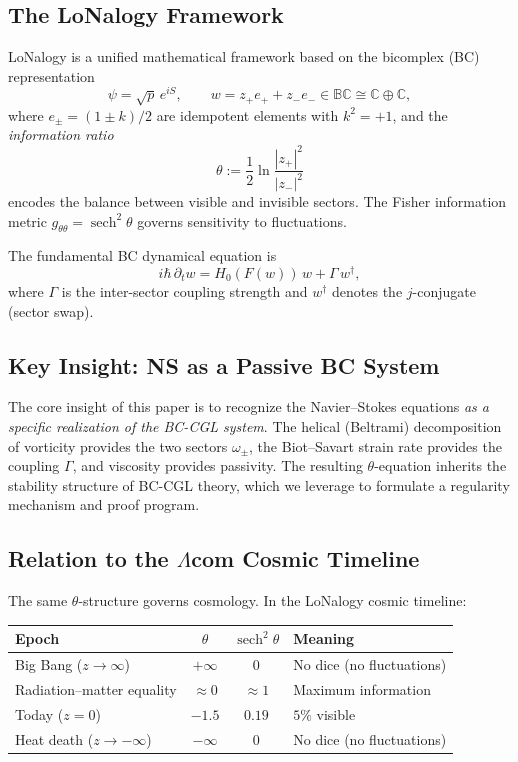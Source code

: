 \documentclass[12pt,a4paper]{article}
\theoremstyle{definition}
\newcommand{\sech}{\operatorname{sech}}
\newcommand{\BC}{\mathbb{BC}}
\newcommand{\C}{\mathbb{C}}
\begin{document}
\subsection{The LoNalogy Framework}

LoNalogy is a unified mathematical framework based on the bicomplex (BC) representation
\begin{equation}\label{eq:lonalogy}
  \psi = \sqrt{p}\,e^{iS}, \qquad
  w = z_+ e_+ + z_- e_- \in \BC \cong \C \oplus \C,
\end{equation}
where $e_\pm = (1 \pm k)/2$ are idempotent elements with $k^2 = +1$, and the \emph{information ratio}
\begin{equation}\label{eq:theta}
  \theta := \frac{1}{2}\ln\frac{|z_+|^2}{|z_-|^2}
\end{equation}
encodes the balance between visible and invisible sectors. The Fisher information metric $g_{\theta\theta} = \sech^2\theta$ governs sensitivity to fluctuations.

The fundamental BC dynamical equation is
\begin{equation}\label{eq:BC}
  i\hbar\,\partial_t w = H_0(F(w))\,w + \Gamma\,w^\dagger,
\end{equation}
where $\Gamma$ is the inter-sector coupling strength and $w^\dagger$ denotes the $j$-conjugate (sector swap).

\subsection{Key Insight: NS as a Passive BC System}

The core insight of this paper is to recognize the Navier--Stokes equations \emph{as a specific realization of the BC-CGL system}. The helical (Beltrami) decomposition of vorticity provides the two sectors $\omega_\pm$, the Biot--Savart strain rate provides the coupling $\Gamma$, and viscosity provides passivity. The resulting $\theta$-equation inherits the stability structure of BC-CGL theory, which we leverage to formulate a regularity mechanism and proof program.

\subsection{Relation to the $\Lambda$com Cosmic Timeline}

The same $\theta$-structure governs cosmology. In the LoNalogy cosmic timeline:

\begin{center}
\begin{tabular}{lccl}
\toprule
\textbf{Epoch} & $\theta$ & $\sech^2\theta$ & \textbf{Meaning} \\
\midrule
Big Bang ($z \to \infty$) & $+\infty$ & $0$ & No dice (no fluctuations) \\
Radiation--matter equality & $\approx 0$ & $\approx 1$ & Maximum information \\
Today ($z = 0$) & $-1.5$ & $0.19$ & $5\%$ visible \\
Heat death ($z \to -\infty$) & $-\infty$ & $0$ & No dice (no fluctuations) \\
\bottomrule
\end{tabular}
\end{center}
\end{document}
